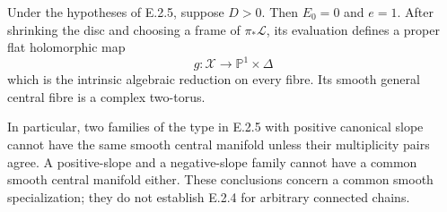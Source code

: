 \begin{proposition}
Under the hypotheses of E.2.5, suppose $D>0$.  Then $E_0=0$
and $e=1$.  After shrinking the disc and choosing a frame of
$\pi_*\mathcal L$, its evaluation defines a proper flat
holomorphic map
\[
 g:\mathcal X\longrightarrow\mathbb P^1\times\Delta
\]
which is the intrinsic algebraic reduction on every fibre.
Its smooth general central fibre is a complex two-torus.

In particular, two families of the type in E.2.5 with positive
canonical slope cannot have the same smooth central manifold
unless their multiplicity pairs agree.  A positive-slope and
a negative-slope family cannot have a common smooth central
manifold either.  These conclusions concern a common smooth
specialization; they do not establish E.2.4 for arbitrary
connected chains.
\end{proposition}
